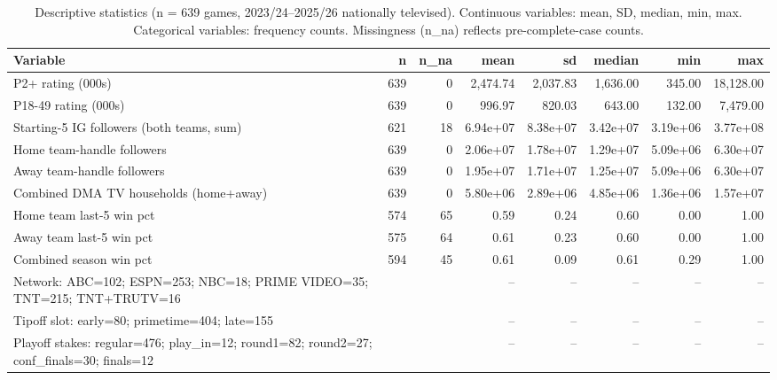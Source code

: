 \begin{table}[ht]
\centering
\caption{Descriptive statistics (n = 639 games, 2023/24--2025/26 nationally televised). Continuous variables: mean, SD, median, min, max. Categorical variables: frequency counts. Missingness (n\_na) reflects pre-complete-case counts.} 
\label{tab:descriptive}
\begin{tabular}{lrrrrrrr}
  \toprule
Variable & n & n_na & mean & sd & median & min & max \\ 
  \midrule
P2+ rating (000s) & 639 & 0 & 2,474.74 & 2,037.83 & 1,636.00 & 345.00 & 18,128.00 \\ 
  P18-49 rating (000s) & 639 & 0 & 996.97 & 820.03 & 643.00 & 132.00 & 7,479.00 \\ 
  Starting-5 IG followers (both teams, sum) & 621 & 18 & 6.94e+07 & 8.38e+07 & 3.42e+07 & 3.19e+06 & 3.77e+08 \\ 
  Home team-handle followers & 639 & 0 & 2.06e+07 & 1.78e+07 & 1.29e+07 & 5.09e+06 & 6.30e+07 \\ 
  Away team-handle followers & 639 & 0 & 1.95e+07 & 1.71e+07 & 1.25e+07 & 5.09e+06 & 6.30e+07 \\ 
  Combined DMA TV households (home+away) & 639 & 0 & 5.80e+06 & 2.89e+06 & 4.85e+06 & 1.36e+06 & 1.57e+07 \\ 
  Home team last-5 win pct & 574 & 65 & 0.59 & 0.24 & 0.60 & 0.00 & 1.00 \\ 
  Away team last-5 win pct & 575 & 64 & 0.61 & 0.23 & 0.60 & 0.00 & 1.00 \\ 
  Combined season win pct & 594 & 45 & 0.61 & 0.09 & 0.61 & 0.29 & 1.00 \\ 
  Network: ABC=102; ESPN=253; NBC=18; PRIME VIDEO=35; TNT=215; TNT+TRUTV=16 &  &  & -- & -- & -- & -- & -- \\ 
  Tipoff slot: early=80; primetime=404; late=155 &  &  & -- & -- & -- & -- & -- \\ 
  Playoff stakes: regular=476; play_in=12; round1=82; round2=27; conf_finals=30; finals=12 &  &  & -- & -- & -- & -- & -- \\ 
   \bottomrule
\end{tabular}
\end{table}
